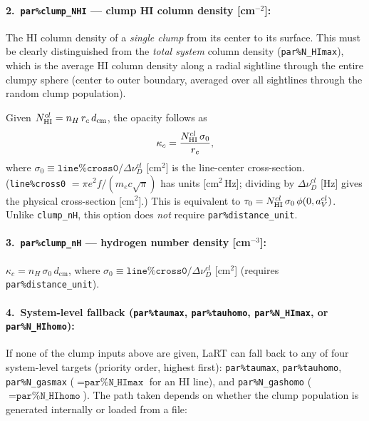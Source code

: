 \documentclass[english,a4paper]{my_memo}
\begin{document}
\paragraph{2.~\texttt{par\%clump\_NHI} — clump HI column density [cm$^{-2}$]:}
The HI column density of a \emph{single clump} from its center to its surface.
This must be clearly distinguished from the \emph{total system} column density
(\texttt{par\%N\_HImax}), which is the average HI column density along a
radial sightline through the entire clumpy sphere (center to outer boundary,
averaged over all sightlines through the random clump population).

Given $N_{\rm HI}^{cl} = n_H\,r_c\,d_{\rm cm}$, the opacity follows as
\begin{equation}
  \kappa_c = \frac{N_{\rm HI}^{cl}\,\sigma_0}{r_c},
\end{equation}
where $\sigma_0 \equiv \texttt{line\%cross0}/\Delta\nu_D^{cl}$ [cm$^2$] is the
line-center cross-section.
(\texttt{line\%cross0} $= \pi e^2 f/(m_e c\sqrt{\pi})$ has units [cm$^2$\,Hz];
dividing by $\Delta\nu_D^{cl}$ [Hz] gives the physical cross-section [cm$^2$].)
This is equivalent to $\tau_0 = N_{\rm HI}^{cl}\,\sigma_0\,\phi(0,a_V^{cl})$.
Unlike \texttt{clump\_nH}, this option does \emph{not} require
\texttt{par\%distance\_unit}.

\paragraph{3.~\texttt{par\%clump\_nH} — hydrogen number density [cm$^{-3}$]:}
$\kappa_c = n_H\,\sigma_0\,d_\mathrm{cm}$,
where $\sigma_0 \equiv \texttt{line\%cross0}/\Delta\nu_D^{cl}$ [cm$^2$]
(requires \texttt{par\%distance\_unit}).

\paragraph{4.~System-level fallback (\texttt{par\%taumax}, \texttt{par\%tauhomo}, \texttt{par\%N\_HImax}, or \texttt{par\%N\_HIhomo}):}
\label{par:taumax_fallback}
If none of the clump inputs above are given, LaRT can fall back to
any of four system-level targets (priority order, highest first):
\texttt{par\%taumax}, \texttt{par\%tauhomo}, \texttt{par\%N\_gasmax}
($=\texttt{par\%N\_HImax}$ for an HI line), and \texttt{par\%N\_gashomo}
($=\texttt{par\%N\_HIhomo}$).  The path taken depends on whether the
clump population is generated internally or loaded from a file:
\end{document}
